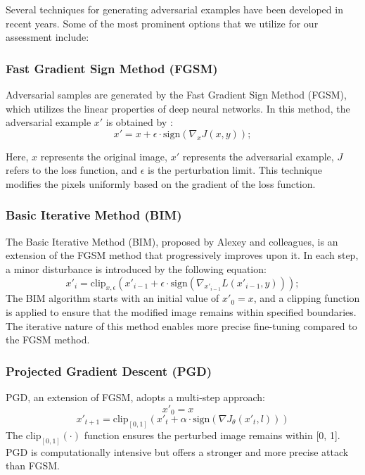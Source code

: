 \documentclass[10pt, conference, a4paper, final]{IEEEtran}
\begin{document}
Several techniques for generating adversarial examples have been developed in recent years. Some of the most prominent options that we utilize for our assessment include:


\subsubsection{Fast Gradient Sign Method (FGSM) \cite {Goodfellow.}}

Adversarial samples are generated by the Fast Gradient Sign Method (FGSM), which utilizes the linear properties of deep neural networks. In this method, the adversarial example \( x' \) is obtained by :
\begin{equation}
    x' = x + \epsilon \cdot \text{sign}(\nabla_x J(x, y));
\end{equation}

Here, \( x \) represents the original image, \( x' \) represents the adversarial example, \( J \) refers to the loss function, and \( \epsilon \) is the perturbation limit. This technique modifies the pixels uniformly based on the gradient of the loss function.



\subsubsection{Basic Iterative Method (BIM) \cite {Kurakin., Madry.}}

The Basic Iterative Method (BIM), proposed by Alexey and colleagues, is an extension of the FGSM method that progressively improves upon it. In each step, a minor disturbance is introduced by the following equation: 
\begin{equation}
    x'_{i} = \text{clip}_{x, \epsilon} \left( x'_{i-1} + \epsilon \cdot \text{sign}(\nabla_{x'_{i-1}} L(x'_{i-1}, y)) \right);
    \end{equation}
The BIM algorithm starts with an initial value of \( x'_0 = x \), and a clipping function is applied to ensure that the modified image remains within specified boundaries. The iterative nature of this method enables more precise fine-tuning compared to the FGSM method.


\subsubsection{Projected Gradient Descent (PGD) \cite {Stiff}}

PGD, an extension of FGSM, adopts a multi-step approach:
\begin{equation}
x'_0 = x \quad 
\end{equation}
\begin{equation}
x'_{t+1} = \text{clip}_{[0,1]} \left( x'_t + \alpha \cdot \text{sign}(\nabla J_\theta(x'_t, l)) \right)
\end{equation}
The \(\text{clip}_{[0,1]}(\cdot)\) function ensures the perturbed image remains within [0, 1]. PGD is computationally intensive but offers a stronger and more precise attack than FGSM.
\end{document}
